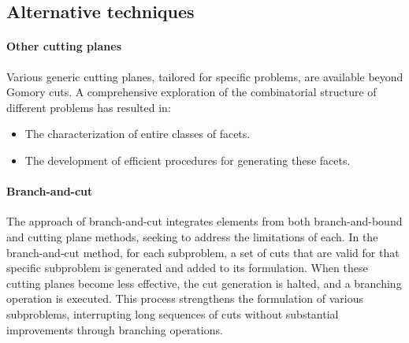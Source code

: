 \subsection{Alternative techniques}
\paragraph*{Other cutting planes}
Various generic cutting planes, tailored for specific problems, are available beyond Gomory cuts.
A comprehensive exploration of the combinatorial structure of different problems has resulted in:
\begin{itemize}
    \item The characterization of entire classes of facets.
    \item The development of efficient procedures for generating these facets.
\end{itemize}

\paragraph*{Branch-and-cut}
The approach of branch-and-cut integrates elements from both branch-and-bound and cutting plane methods, seeking to address the limitations of each. 
In the branch-and-cut method, for each subproblem, a set of cuts that are valid for that specific subproblem is generated and added to its formulation. 
When these cutting planes become less effective, the cut generation is halted, and a branching operation is executed. 
This process strengthens the formulation of various subproblems, interrupting long sequences of cuts without substantial improvements through branching operations.